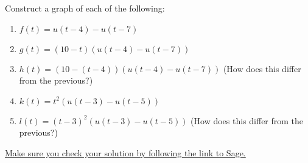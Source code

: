 \begin{problem}
 Construct a graph of each of the following:
\begin{enumerate}
 \item $f(t) = u(t-4) - u(t-7)$
 \item $g(t) = (10-t)(u(t-4) - u(t-7))$
 \item $h(t) = (10-(t-4))(u(t-4) - u(t-7))$ (How does this differ from the previous?)
 \item $k(t) = t^2 (u(t-3) - u(t-5))$
 \item $l(t) = (t-3)^2( u(t-3) - u(t-5))$ (How does this differ from the previous?)
\end{enumerate}
\href{http://aleph.sagemath.org/?z=eJwrSyzSUC9R1-RK0yjRtNUwNNAt0dTSyEhNLMsszkxJ1SjRNdHUReaaa2pycRXk5JdogHToaJToGOhYaGoCAP0RFH0=&lang=sage}{Make sure you check your solution by following the link to Sage.}
\end{problem}


